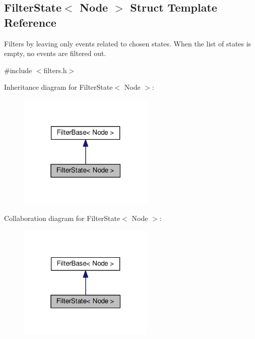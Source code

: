 \hypertarget{structFilterState}{}\subsection{Filter\+State$<$ Node $>$ Struct Template Reference}
\label{structFilterState}


Filters by leaving only events related to chosen states. When the list of states is empty, no events are filtered out.  




{\ttfamily \#include $<$filters.\+h$>$}



Inheritance diagram for Filter\+State$<$ Node $>$\+:\nopagebreak
\begin{figure}[H]
\begin{center}
\leavevmode
\includegraphics[width=183pt]{structFilterState__inherit__graph}
\end{center}
\end{figure}


Collaboration diagram for Filter\+State$<$ Node $>$\+:\nopagebreak
\begin{figure}[H]
\begin{center}
\leavevmode
\includegraphics[width=183pt]{structFilterState__coll__graph}
\end{center}
\end{figure}
